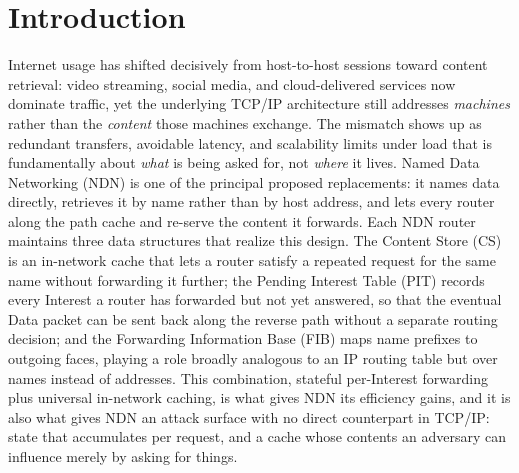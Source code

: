 \section{Introduction}
\label{sec:introduction}

Internet usage has shifted decisively from host-to-host sessions toward content retrieval: video streaming, social media, and cloud-delivered services now dominate traffic, yet the underlying TCP/IP architecture still addresses \emph{machines} rather than the \emph{content} those machines exchange. The mismatch shows up as redundant transfers, avoidable latency, and scalability limits under load that is fundamentally about \emph{what} is being asked for, not \emph{where} it lives. Named Data Networking (NDN) \cite{zhang2010ndn} is one of the principal proposed replacements: it names data directly, retrieves it by name rather than by host address, and lets every router along the path cache and re-serve the content it forwards. Each NDN router maintains three data structures that realize this design. The Content Store (CS) is an in-network cache that lets a router satisfy a repeated request for the same name without forwarding it further; the Pending Interest Table (PIT) records every Interest a router has forwarded but not yet answered, so that the eventual Data packet can be sent back along the reverse path without a separate routing decision; and the Forwarding Information Base (FIB) maps name prefixes to outgoing faces, playing a role broadly analogous to an IP routing table but over names instead of addresses. This combination, stateful per-Interest forwarding plus universal in-network caching, is what gives NDN its efficiency gains, and it is also what gives NDN an attack surface with no direct counterpart in TCP/IP: state that accumulates per request, and a cache whose contents an adversary can influence merely by asking for things.

